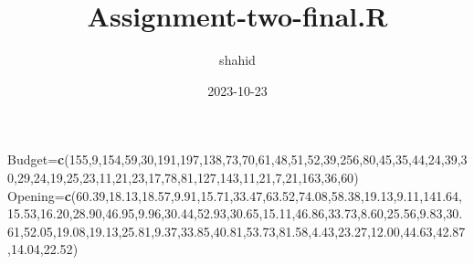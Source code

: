 \documentclass[
]{article}
\title{Assignment-two-final.R}
\author{shahid}
\date{2023-10-23}
\newenvironment{Shaded}{\begin{snugshade}}{\end{snugshade}}
\newcommand{\DecValTok}[1]{\textcolor[rgb]{0.00,0.00,0.81}{#1}}
\newcommand{\FloatTok}[1]{\textcolor[rgb]{0.00,0.00,0.81}{#1}}
\newcommand{\FunctionTok}[1]{\textcolor[rgb]{0.13,0.29,0.53}{\textbf{#1}}}
\newcommand{\NormalTok}[1]{#1}
\newcommand{\OtherTok}[1]{\textcolor[rgb]{0.56,0.35,0.01}{#1}}
\begin{document}
\maketitle

\begin{Shaded}
\begin{Highlighting}[]
\NormalTok{Budget}\OtherTok{=}\FunctionTok{c}\NormalTok{(}\DecValTok{155}\NormalTok{,}\DecValTok{9}\NormalTok{,}\DecValTok{154}\NormalTok{,}\DecValTok{59}\NormalTok{,}\DecValTok{30}\NormalTok{,}\DecValTok{191}\NormalTok{,}\DecValTok{197}\NormalTok{,}\DecValTok{138}\NormalTok{,}\DecValTok{73}\NormalTok{,}\DecValTok{70}\NormalTok{,}\DecValTok{61}\NormalTok{,}\DecValTok{48}\NormalTok{,}\DecValTok{51}\NormalTok{,}\DecValTok{52}\NormalTok{,}\DecValTok{39}\NormalTok{,}\DecValTok{256}\NormalTok{,}\DecValTok{80}\NormalTok{,}\DecValTok{45}\NormalTok{,}\DecValTok{35}\NormalTok{,}\DecValTok{44}\NormalTok{,}\DecValTok{24}\NormalTok{,}\DecValTok{39}\NormalTok{,}\DecValTok{30}\NormalTok{,}\DecValTok{29}\NormalTok{,}\DecValTok{24}\NormalTok{,}\DecValTok{19}\NormalTok{,}\DecValTok{25}\NormalTok{,}\DecValTok{23}\NormalTok{,}\DecValTok{11}\NormalTok{,}\DecValTok{21}\NormalTok{,}\DecValTok{23}\NormalTok{,}\DecValTok{17}\NormalTok{,}\DecValTok{78}\NormalTok{,}\DecValTok{81}\NormalTok{,}\DecValTok{127}\NormalTok{,}\DecValTok{143}\NormalTok{,}\DecValTok{11}\NormalTok{,}\DecValTok{21}\NormalTok{,}\DecValTok{7}\NormalTok{,}\DecValTok{21}\NormalTok{,}\DecValTok{163}\NormalTok{,}\DecValTok{36}\NormalTok{,}\DecValTok{60}\NormalTok{)}
\NormalTok{Opening}\OtherTok{=}\FunctionTok{c}\NormalTok{(}\FloatTok{60.39}\NormalTok{,}\FloatTok{18.13}\NormalTok{,}\FloatTok{18.57}\NormalTok{,}\FloatTok{9.91}\NormalTok{,}\FloatTok{15.71}\NormalTok{,}\FloatTok{33.47}\NormalTok{,}\FloatTok{63.52}\NormalTok{,}\FloatTok{74.08}\NormalTok{,}\FloatTok{58.38}\NormalTok{,}\FloatTok{19.13}\NormalTok{,}\FloatTok{9.11}\NormalTok{,}\FloatTok{141.64}\NormalTok{,}\FloatTok{15.53}\NormalTok{,}\FloatTok{16.20}\NormalTok{,}\FloatTok{28.90}\NormalTok{,}\FloatTok{46.95}\NormalTok{,}\FloatTok{9.96}\NormalTok{,}\FloatTok{30.44}\NormalTok{,}\FloatTok{52.93}\NormalTok{,}\FloatTok{30.65}\NormalTok{,}\FloatTok{15.11}\NormalTok{,}\FloatTok{46.86}\NormalTok{,}\FloatTok{33.73}\NormalTok{,}\FloatTok{8.60}\NormalTok{,}\FloatTok{25.56}\NormalTok{,}\FloatTok{9.83}\NormalTok{,}\FloatTok{30.61}\NormalTok{,}\FloatTok{52.05}\NormalTok{,}\FloatTok{19.08}\NormalTok{,}\FloatTok{19.13}\NormalTok{,}\FloatTok{25.81}\NormalTok{,}\FloatTok{9.37}\NormalTok{,}\FloatTok{33.85}\NormalTok{,}\FloatTok{40.81}\NormalTok{,}\FloatTok{53.73}\NormalTok{,}\FloatTok{81.58}\NormalTok{,}\FloatTok{4.43}\NormalTok{,}\FloatTok{23.27}\NormalTok{,}\FloatTok{12.00}\NormalTok{,}\FloatTok{44.63}\NormalTok{,}\FloatTok{42.87}\NormalTok{,}\FloatTok{14.04}\NormalTok{,}\FloatTok{22.52}\NormalTok{)}

\end{Highlighting}
\end{Shaded}
\end{document}
